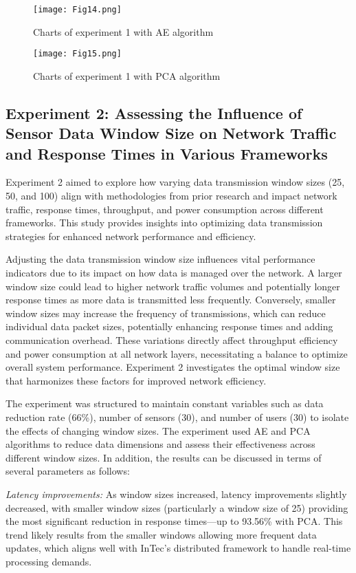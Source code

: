 \documentclass[11pt]{article}
\begin{document}
	\begin{figure}[h]
		\centering
		\texttt{[image: Fig14.png]}
		\caption{Charts of experiment 1 with AE algorithm}
	\end{figure}
	
	\begin{figure}[h]
		\centering
		\texttt{[image: Fig15.png]}
		\caption{Charts of experiment 1 with PCA algorithm}
	\end{figure}

	\subsection{\textbf{Experiment 2:} Assessing the Influence of Sensor Data Window Size on Network Traffic and Response Times in Various Frameworks}
	Experiment 2 aimed to explore how varying data transmission window sizes (25,
	50, and 100) align with methodologies from prior research \cite{c15} and impact network
	traffic, response times, throughput, and power consumption across different frameworks. This study provides insights into optimizing data transmission strategies for
	enhanced network performance and efficiency.
	
	Adjusting the data transmission window size influences vital performance indicators due to its impact on how data is managed over the network. A larger window
	size could lead to higher network traffic volumes and potentially longer response
	times as more data is transmitted less frequently. Conversely, smaller window sizes
	may increase the frequency of transmissions, which can reduce individual data
	packet sizes, potentially enhancing response times and adding communication overhead. These variations directly affect throughput efficiency and power consumption
	at all network layers, necessitating a balance to optimize overall system performance. Experiment 2 investigates the optimal window size that harmonizes these
	factors for improved network efficiency.
	
	The experiment was structured to maintain constant variables such as data reduction rate (66\%), number of sensors (30), and number of users (30) to isolate the
	effects of changing window sizes. The experiment used AE and PCA algorithms to
	reduce data dimensions and assess their effectiveness across different window sizes.
	In addition, the results can be discussed in terms of several parameters as follows:
	
	\textit{Latency improvements:} As window sizes increased, latency improvements
	slightly decreased, with smaller window sizes (particularly a window size of 25)
	providing the most significant reduction in response times—up to 93.56\% with
	PCA. This trend likely results from the smaller windows allowing more frequent
	data updates, which aligns well with InTec’s distributed framework to handle
	real-time processing demands.
	
\end{document}
